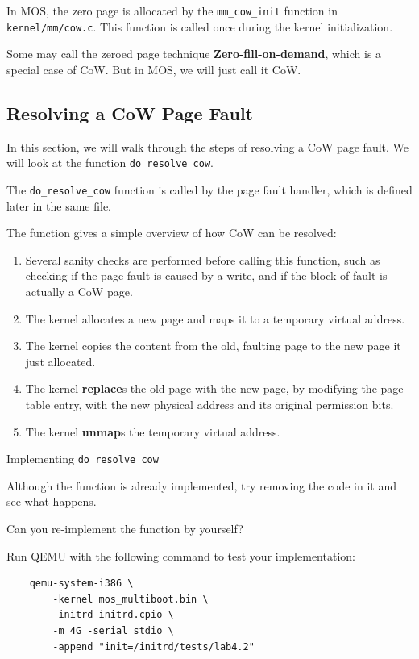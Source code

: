 In MOS, the zero page is allocated by the \texttt{mm\_cow\_init} function in
\texttt{kernel/mm/cow.c}. This function is called once during the kernel
initialization.

\begin{note}
    \item Some may call the zeroed page technique \textbf{Zero-fill-on-demand},
    which is a special case of CoW. But in MOS, we will just call it CoW.
\end{note}


\subsection{Resolving a CoW Page Fault}

In this section, we will walk through the steps of resolving a CoW page fault.
We will look at the function \texttt{do\_resolve\_cow}.

\begin{note}
    \item The \texttt{do\_resolve\_cow} function is called by the page fault
    handler, which is defined later in the same file.
\end{note}

The function gives a simple overview of how CoW can be resolved:

\begin{enumerate}
    \item Several sanity checks are performed before calling this function,
          such as checking if the page fault is caused by a write, and if the
          block of fault is actually a CoW page.
    \item The kernel allocates a new page and maps it to a temporary virtual
          address.
    \item The kernel copies the content from the old, faulting page to the new
          page it just allocated.
    \item The kernel \textbf{replace}s the old page with the new page, by
          modifying the page table entry, with the new physical address and
          its original permission bits.
    \item The kernel \textbf{unmap}s the temporary virtual address.
\end{enumerate}

\begin{exercise*}{Implementing \texttt{do\_resolve\_cow}}
    \item Although the function is already implemented, try removing
    the code in it and see what happens.
    \item Can you re-implement the function by yourself?

    Run QEMU with the following command to test your implementation:

    \begin{verbatim}
    qemu-system-i386 \
        -kernel mos_multiboot.bin \
        -initrd initrd.cpio \
        -m 4G -serial stdio \
        -append "init=/initrd/tests/lab4.2"
    \end{verbatim}
\end{exercise*}

